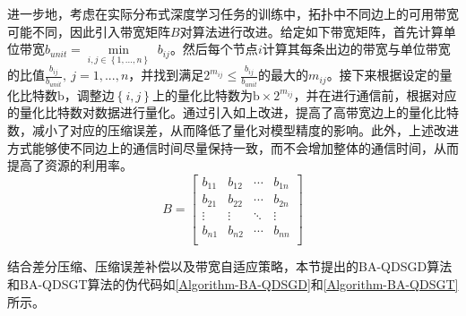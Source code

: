 进一步地，考虑在实际分布式深度学习任务的训练中，拓扑中不同边上的可用带宽可能不同，因此引入带宽矩阵$B$对算法进行改进。给定如下带宽矩阵，首先计算单位带宽$b_{unit}=\underset{i,j\in \left\{ 1,...,n \right\}}{\min}\,\,b_{ij}$。然后每个节点$i$计算其每条出边的带宽与单位带宽的比值$\frac{b_{ij}}{b_{unit}},\ j=1,...,n$，并找到满足$2^{m_{ij}}\leqslant \frac{b_{ij}}{b_{unit}}$的最大的$m_{ij}$。接下来根据设定的量化比特数$\mathrm{b}$，调整边$\left\{ i,j \right\}$上的量化比特数为$\mathrm{b}\times 2^{m_{ij}}$，并在进行通信前，根据对应的量化比特数对数据进行量化。通过引入如上改进，提高了高带宽边上的量化比特数，减小了对应的压缩误差，从而降低了量化对模型精度的影响。此外，上述改进方式能够使不同边上的通信时间尽量保持一致，而不会增加整体的通信时间，从而提高了资源的利用率。
\begin{equation}
    \label{tab:equ-4-12}
    B=\left[ \begin{matrix}
        b_{11}&		b_{12}&		\cdots&		b_{1n}\\
        b_{21}&		b_{22}&		\cdots&		b_{2n}\\
        \vdots&		\vdots&		\ddots&		\vdots\\
        b_{n1}&		b_{n2}&		\cdots&		b_{nn}\\
    \end{matrix} \right] 
\end{equation}

结合差分压缩、压缩误差补偿以及带宽自适应策略，本节提出的BA-QDSGD算法和BA-QDSGT算法的伪代码如\autoref{Algorithm-BA-QDSGD}和\autoref{Algorithm-BA-QDSGT}所示。

